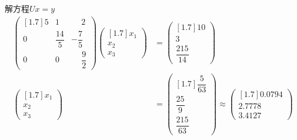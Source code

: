 \documentclass[11pt]{article}
\begin{document}
\begin{question}
{        解方程$Ux = y$
        \begin{align*}
            \begin{pmatrix}[1.7]
                5 & 1             & \phantom{-}2            \\
                0 & \dfrac{14}{5} & -\dfrac{7}{5}           \\
                0 & 0             & \phantom{-}\dfrac{9}{2}
            \end{pmatrix}
            \begin{pmatrix}[1.7]
                x_1 \\
                x_2 \\
                x_3
            \end{pmatrix}
             & =
            \begin{pmatrix}[1.7]
                10 \\
                3  \\
                \dfrac{215}{14}
            \end{pmatrix} \\
            \begin{pmatrix}[1.7]
                x_1 \\
                x_2 \\
                x_3
            \end{pmatrix}
             & =
            \begin{pmatrix}[1.7]
                \dfrac{5}{63} \\
                \dfrac{25}{9} \\
                \dfrac{215}{63}
            \end{pmatrix}
            \approx
            \begin{pmatrix}[1.7]
                0.0794 \\
                2.7778 \\
                3.4127
            \end{pmatrix}
        \end{align*}
    }

\end{question}
\end{document}
